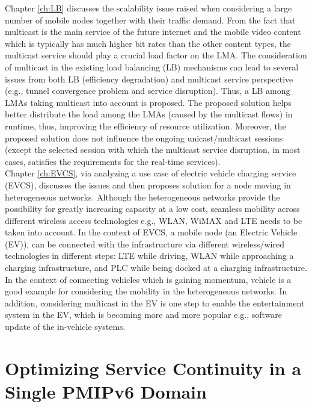 \documentclass[a4paper,10pt,twoside]{ThesisStyle}
\begin{document}
Chapter \ref{ch:LB} discusses the scalability issue raised when considering a large number of mobile nodes together with their traffic demand. From the fact that multicast is the main service of the future internet and the mobile video content which is typically has much higher bit rates than the other content types, the multicast service should play a crucial load factor on the LMA. The consideration of multicast in the existing load balancing (LB) mechanisms can lead to several issues from both LB (efficiency degradation) and multicast service perspective (e.g., tunnel convergence problem and service disruption). Thus, a LB among LMAs taking multicast into account is proposed. The proposed solution helps better distribute the load among the LMAs (caused by the multicast flows) in runtime, thus, improving the efficiency of resource utilization. Moreover, the proposed solution does not influence the ongoing unicast/multicast sessions (except the selected session with which the multicast service disruption, in most cases, satisfies the requirements for the real-time services). \\

Chapter \ref{ch:EVCS}, via analyzing a use case of electric vehicle charging service (EVCS), discusses the issues and then proposes solution for a node moving in heterogeneous networks. Although the heterogeneous networks provide the possibility for greatly increasing capacity at a low cost, seamless mobility across different wireless access technologies e.g., WLAN, WiMAX and LTE needs to be taken into account. In the context of EVCS, a mobile node (an Electric Vehicle (EV)), can be connected with the infrastructure via different wireless/wired technologies in different steps: LTE while driving, WLAN while approaching a charging infrastructure, and PLC while being docked at a charging infrastructure. In the context of connecting vehicles which is gaining momentum, vehicle is a good example for considering the mobility in the heterogeneous networks. In addition, considering multicast in the EV is one step to enable the entertainment system in the EV, which is becoming more and more popular e.g., software update of the in-vehicle systems.\\

\chapter{Optimizing Service Continuity in a Single PMIPv6 Domain} \label{ch:multicast_PMIP} 

\end{document}
